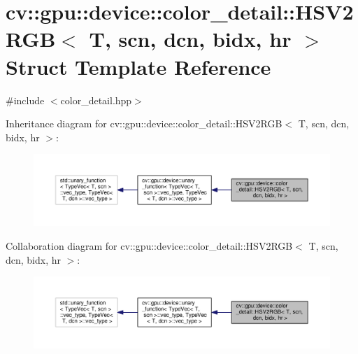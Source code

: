 \hypertarget{structcv_1_1gpu_1_1device_1_1color__detail_1_1HSV2RGB}{\section{cv\-:\-:gpu\-:\-:device\-:\-:color\-\_\-detail\-:\-:H\-S\-V2\-R\-G\-B$<$ T, scn, dcn, bidx, hr $>$ Struct Template Reference}
\label{structcv_1_1gpu_1_1device_1_1color__detail_1_1HSV2RGB}
}


{\ttfamily \#include $<$color\-\_\-detail.\-hpp$>$}



Inheritance diagram for cv\-:\-:gpu\-:\-:device\-:\-:color\-\_\-detail\-:\-:H\-S\-V2\-R\-G\-B$<$ T, scn, dcn, bidx, hr $>$\-:\nopagebreak
\begin{figure}[H]
\begin{center}
\leavevmode
\includegraphics[width=350pt]{structcv_1_1gpu_1_1device_1_1color__detail_1_1HSV2RGB__inherit__graph}
\end{center}
\end{figure}


Collaboration diagram for cv\-:\-:gpu\-:\-:device\-:\-:color\-\_\-detail\-:\-:H\-S\-V2\-R\-G\-B$<$ T, scn, dcn, bidx, hr $>$\-:\nopagebreak
\begin{figure}[H]
\begin{center}
\leavevmode
\includegraphics[width=350pt]{structcv_1_1gpu_1_1device_1_1color__detail_1_1HSV2RGB__coll__graph}
\end{center}
\end{figure}
